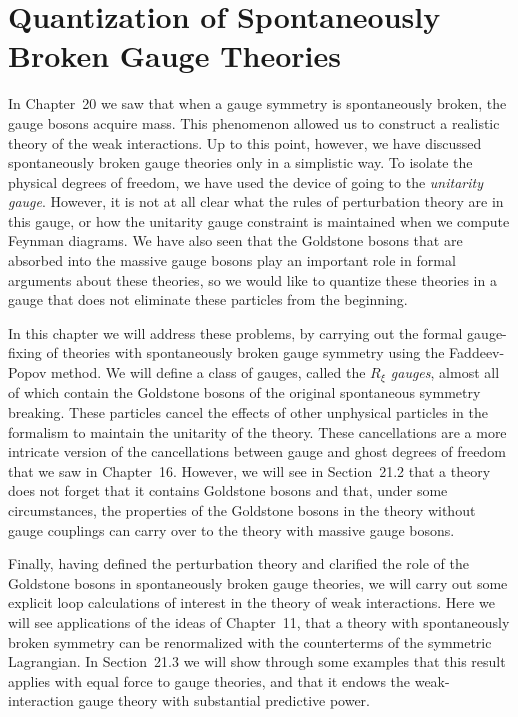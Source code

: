 \chapter{Quantization of Spontaneously Broken Gauge Theories}

In Chapter~20 we saw that when a gauge symmetry is spontaneously broken, the
gauge bosons acquire mass.  This phenomenon allowed us to construct a
realistic theory of the weak interactions.  Up to this point, however, we have
discussed spontaneously broken gauge theories only in a simplistic way.  To
isolate the physical degrees of freedom, we have used the device of going to
the \emph{unitarity gauge}.  However, it is not at all clear what the rules of
perturbation theory are in this gauge, or how the unitarity gauge constraint
is maintained when we compute Feynman diagrams.  We have also seen that the
Goldstone bosons that are absorbed into the massive gauge bosons play an
important role in formal arguments about these theories, so we would like to
quantize these theories in a gauge that does not eliminate these particles
from the beginning.

In this chapter we will address these problems, by carrying out the formal
gauge-fixing of theories with spontaneously broken gauge symmetry using the
Faddeev-Popov method.  We will define a class of gauges, called the
\emph{$R_\xi$ gauges}, almost all of which contain the Goldstone bosons of the
original spontaneous symmetry breaking.  These particles cancel the effects of
other unphysical particles in the formalism to maintain the unitarity of the
theory.  These cancellations are a more intricate version of the cancellations
between gauge and ghost degrees of freedom that we saw in Chapter~16.
However, we will see in Section~21.2 that a theory does not forget that it
contains Goldstone bosons and that, under some circumstances, the properties
of the Goldstone bosons in the theory without gauge couplings can carry over
to the theory with massive gauge bosons.

Finally, having defined the perturbation theory and clarified the role of the
Goldstone bosons in spontaneously broken gauge theories, we will carry out
some explicit loop calculations of interest in the theory of weak
interactions.  Here we will see applications of the ideas of Chapter~11, that
a theory with spontaneously broken symmetry can be renormalized with the
counterterms of the symmetric Lagrangian.  In Section~21.3 we will show
through some examples that this result applies with equal force to gauge
theories, and that it endows the weak-interaction gauge theory with
substantial predictive power.


